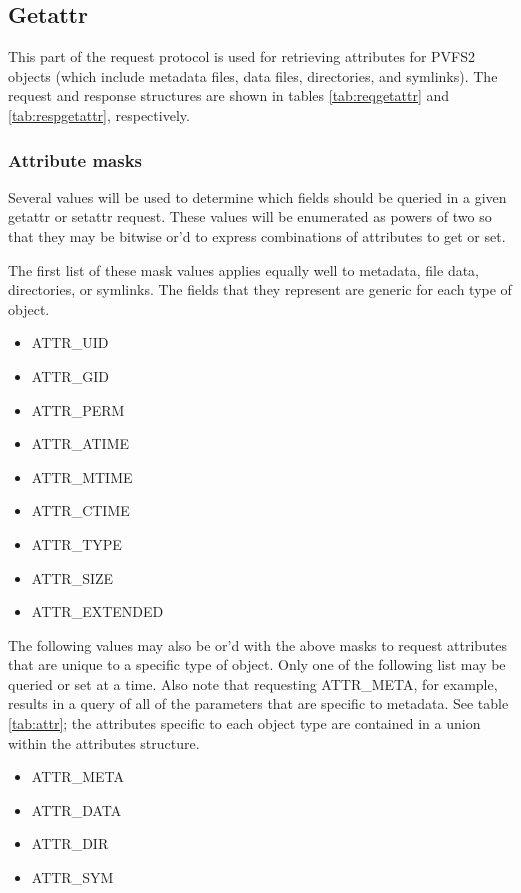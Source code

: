 \documentclass[11pt, letterpaper]{article} %
\begin{document}
\subsection{Getattr}
\label{sec:getattr}

This part of the request protocol is used for retrieving attributes for
PVFS2 objects (which include metadata files, data files, directories,
and symlinks).  The request and response structures are shown in tables
\ref{tab:reqgetattr} and \ref{tab:respgetattr}, respectively.

\subsubsection{Attribute masks}
Several values will be used to determine which fields should be
queried in a given getattr or setattr request.  
These values will be enumerated as powers
of two so that they may be bitwise or'd to express combinations of
attributes to get or set.  

The first list of these mask values applies equally well to metadata,
file data, directories, or symlinks.  The fields that they represent
are generic for each type of object.

\begin{itemize}
\item ATTR\_UID
\item ATTR\_GID
\item ATTR\_PERM
\item ATTR\_ATIME
\item ATTR\_MTIME
\item ATTR\_CTIME
\item ATTR\_TYPE
\item ATTR\_SIZE
\item ATTR\_EXTENDED
\end{itemize}

The following values may also be or'd with the above masks to
request attributes that are unique to a specific type of
object.   Only one of the following list may be queried or set at a
time.  Also note that requesting ATTR\_META, for example, results
in a query of all of the parameters that are specific to
metadata.  See table \ref{tab:attr}; the attributes specific to
each object type are contained in a union within the attributes
structure.

\begin{itemize}
\item ATTR\_META
\item ATTR\_DATA
\item ATTR\_DIR
\item ATTR\_SYM
\end{itemize}
\end{document}
